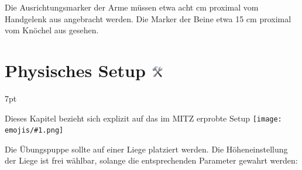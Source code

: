 \documentclass[a4paper, 10pt]{article}
\newcommand{\emoji}[1]{
    \begingroup\normalfont
    \texttt{[image: emojis/\#1.png]}
    \endgroup
}
\newenvironment{tooltip}{%
\small
\vspace*{-4mm}
    \def\FrameCommand{%
    \hspace{1pt}%
    {\color{tooltippipe}\vrule width 0.7mm}%
    {\color{tooltipshade}\vrule width 1.5mm}%
    \colorbox{tooltipshade}%
    }%
    \MakeFramed{\advance\hsize-\width\FrameRestore}%
    \noindent%
    \begin{adjustwidth}{}{7pt}%
    \vspace{2pt}\vspace{2pt}%
}
{%
    \vspace{2pt}\end{adjustwidth}\endMakeFramed%
}
\begin{document}
Die Ausrichtungsmarker der Arme müssen etwa acht cm proximal vom Handgelenk aus angebracht werden. Die Marker der Beine etwa 15 cm proximal vom Knöchel aus gesehen.

\section{Physisches Setup \includegraphics[height=0.65em]{emojis/hammer-and-wrench.png}}
\label{sec:physical-setup}
\begin{tooltip}
    Dieses Kapitel bezieht sich explizit auf das im MITZ erprobte Setup\emoji{index-pointing-up}
\end{tooltip}
Die Übungspuppe sollte auf einer Liege platziert werden. Die Höheneinstellung der Liege ist frei wählbar, solange die entsprechenden Parameter gewahrt werden:
\end{document}
